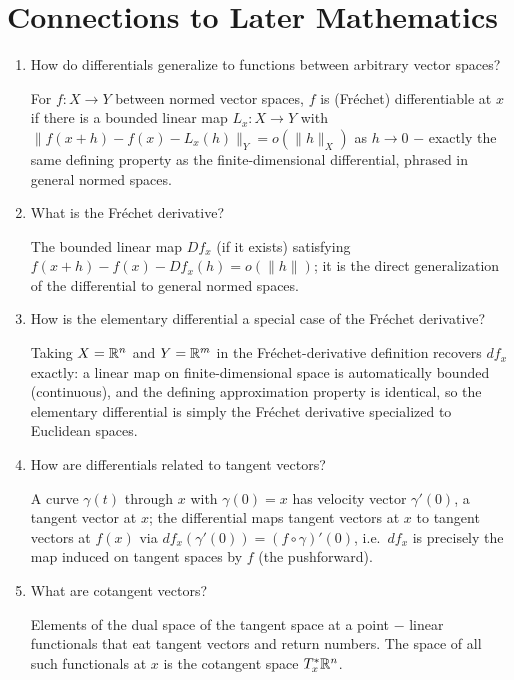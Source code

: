 \documentclass{essay}
\begin{document}
\section{Connections to Later Mathematics}

\begin{enumerate}[resume, leftmargin=*, itemsep=8pt]

\item How do differentials generalize to functions between arbitrary vector spaces?
\begin{answer}
For \(f:X\to Y\) between normed vector spaces, \(f\) is (Fr\'echet) differentiable at \(x\) if there is a bounded linear map \(L_x:X\to Y\) with \(\|f(x+h)-f(x)-L_x(h)\|_Y=o(\|h\|_X)\) as \(h\to0\) \(-\) exactly the same defining property as the finite-dimensional differential, phrased in general normed spaces.
\end{answer}

\item What is the Fr\'echet derivative?
\begin{answer}
The bounded linear map \(Df_x\) (if it exists) satisfying \(f(x+h)-f(x)-Df_x(h)=o(\|h\|)\); it is the direct generalization of the differential to general normed spaces.
\end{answer}

\item How is the elementary differential a special case of the Fr\'echet derivative?
\begin{answer}
Taking \(X=\mathbb{R}^n\) and \(Y=\mathbb{R}^m\) in the Fr\'echet-derivative definition recovers \(df_x\) exactly: a linear map on finite-dimensional space is automatically bounded (continuous), and the defining approximation property is identical, so the elementary differential is simply the Fr\'echet derivative specialized to Euclidean spaces.
\end{answer}

\item How are differentials related to tangent vectors?
\begin{answer}
A curve \(\gamma(t)\) through \(x\) with \(\gamma(0)=x\) has velocity vector \(\gamma'(0)\), a tangent vector at \(x\); the differential maps tangent vectors at \(x\) to tangent vectors at \(f(x)\) via \(df_x(\gamma'(0))=(f\circ\gamma)'(0)\), i.e.\ \(df_x\) is precisely the map induced on tangent spaces by \(f\) (the pushforward).
\end{answer}

\item What are cotangent vectors?
\begin{answer}
Elements of the dual space of the tangent space at a point \(-\) linear functionals that eat tangent vectors and return numbers. The space of all such functionals at \(x\) is the cotangent space \(T_x^*\mathbb{R}^n\).
\end{answer}


\end{enumerate}
\end{document}
